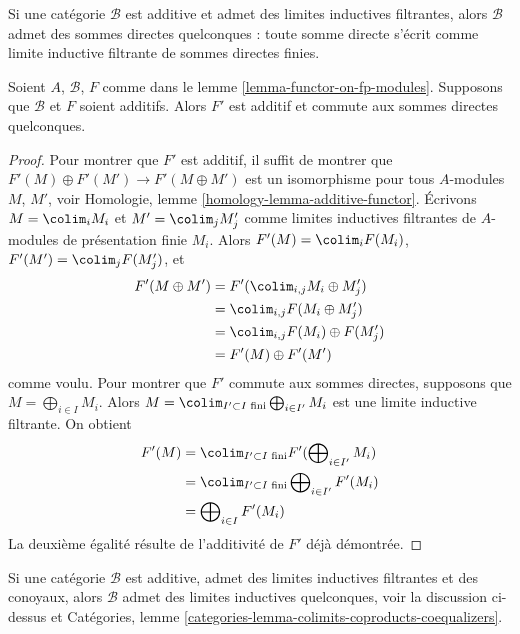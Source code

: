 \noindent
Si une catégorie $\mathcal{B}$ est additive et admet des limites inductives filtrantes,
alors $\mathcal{B}$ admet des sommes directes quelconques : toute somme directe s'écrit
comme limite inductive filtrante de sommes directes finies.

\begin{lemma}
\label{lemma-functor-on-fp-modules-additive}
Soient $A$, $\mathcal{B}$, $F$ comme dans le lemme \ref{lemma-functor-on-fp-modules}.
Supposons que $\mathcal{B}$ et $F$ soient additifs. Alors
$F'$ est additif et commute aux sommes directes quelconques.
\end{lemma}

\begin{proof}
Pour montrer que $F'$ est additif, il suffit de montrer
que $F'(M) \oplus F'(M') \to F'(M \oplus M')$ est un isomorphisme pour
tous $A$-modules $M$, $M'$, voir
Homologie, lemme \ref{homology-lemma-additive-functor}.
Écrivons $M = \colim_i M_i$ et $M' = \colim_j M'_j$ comme limites inductives filtrantes
de $A$-modules de présentation finie $M_i$. Alors
$F'(M) = \colim_i F(M_i)$, $F'(M') = \colim_j F(M'_j)$, et
\begin{align*}
F'(M \oplus M')
& =
F'(\colim_{i, j} M_i \oplus M'_j) \\
& =
\colim_{i, j} F(M_i \oplus M'_j) \\
& =
\colim_{i, j} F(M_i) \oplus F(M'_j) \\
& =
F'(M) \oplus F'(M')
\end{align*}
comme voulu. Pour montrer que $F'$ commute aux sommes directes, supposons
que $M = \bigoplus_{i \in I} M_i$. Alors
$M = \colim_{I' \subset I\text{ fini}} \bigoplus_{i \in I'} M_i$
est une limite inductive filtrante. On obtient
\begin{align*}
F'(M)
& =
\colim_{I' \subset I\text{ fini}}
F'(\bigoplus\nolimits_{i \in I'} M_i) \\
& =
\colim_{I' \subset I\text{ fini}}
\bigoplus\nolimits_{i \in I'} F'(M_i) \\
& =
\bigoplus\nolimits_{i \in I} F'(M_i)
\end{align*}
La deuxième égalité résulte de l'additivité de $F'$ déjà démontrée.
\end{proof}

\noindent
Si une catégorie $\mathcal{B}$ est additive, admet des limites inductives filtrantes et
des conoyaux, alors $\mathcal{B}$ admet des limites inductives quelconques, voir
la discussion ci-dessus et Catégories, lemme
\ref{categories-lemma-colimits-coproducts-coequalizers}.


